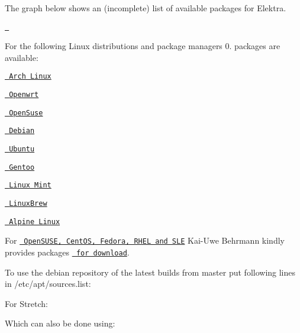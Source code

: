 The graph below shows an (incomplete) list of available packages for Elektra.

\href{https://repology.org/metapackage/elektra/versions}{\texttt{ }}

For the following Linux distributions and package managers 0. packages are available\+:


\begin{DoxyItemize}
\item \href{https://aur.archlinux.org/packages/elektra/}{\texttt{ Arch Linux}}
\item \href{https://github.com/openwrt/packages/tree/master/libs/elektra}{\texttt{ Openwrt}}
\item \href{https://software.opensuse.org/package/elektra}{\texttt{ Open\+Suse}}
\item \href{https://packages.debian.org/de/jessie/libelektra4}{\texttt{ Debian}}
\item \href{https://launchpad.net/ubuntu/+source/elektra}{\texttt{ Ubuntu}}
\item \href{http://packages.gentoo.org/package/app-admin/elektra}{\texttt{ Gentoo}}
\item \href{https://community.linuxmint.com/software/view/elektra-bin}{\texttt{ Linux Mint}}
\item \href{https://github.com/Linuxbrew/homebrew-core/blob/master/Formula/elektra.rb}{\texttt{ Linux\+Brew}}
\item \href{https://pkgs.alpinelinux.org/package/edge/testing/x86_64/elektra}{\texttt{ Alpine Linux}}
\end{DoxyItemize}

For \href{https://build.opensuse.org/package/show/home:bekun:devel/elektra}{\texttt{ Open\+S\+U\+SE, Cent\+OS, Fedora, R\+H\+EL and S\+LE}} Kai-\/\+Uwe Behrmann kindly provides packages \href{http://software.opensuse.org/download.html?project=home%3Abekun%3Adevel&package=libelektra4}{\texttt{ for download}}.

To use the debian repository of the latest builds from master put following lines in {\ttfamily /etc/apt/sources.list}\+:

For Stretch\+:


\begin{DoxyCode}{0}
\end{DoxyCode}


Which can also be done using\+:


